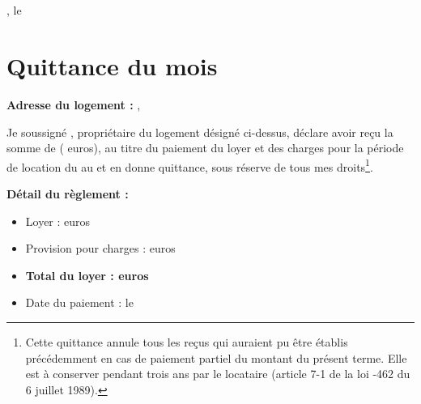\documentclass[11pt, a4paper]{article}
\begin{document}
\small
\textbf{} \textbullet{}  \textbullet{} 

\vspace{3em}

\normalsize \sffamily

 \\
 \\

\vspace{3em}

\begin{flushright}
, le 
\end{flushright}

\vspace{1em}

\section*{\centering Quittance du mois  }

\vspace{3em}

\textbf{Adresse du logement :} , 

\vspace{2em}

Je soussigné , propriétaire du logement désigné ci-dessus,
déclare avoir reçu  la somme de   ( euros),
au titre du paiement du loyer et des charges pour la période de location du
 au  et  en donne quittance,
sous réserve de tous mes droits\footnote{Cette quittance annule tous les reçus qui auraient pu être établis
précédemment en cas de paiement partiel du montant du présent terme.
Elle est à conserver pendant trois ans par le locataire
(article 7-1 de la loi -462 du 6 juillet 1989).}.

\vspace{2em}

\textbf{Détail du règlement :}
\begin{itemize}
\item Loyer :  euros
\item Provision pour charges :  euros
\item \textbf{Total du loyer :  euros} 
\item Date du paiement : le 
\end{itemize}

\vspace{3em}

\begin{flushright}
\end{flushright}
\end{document}
